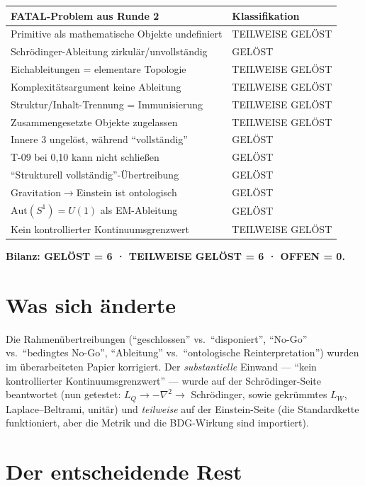 \documentclass[10pt,twoside,openany]{book}
\begin{document}
\begin{center}
\begin{tabular}{p{6.5cm}l}
\toprule
FATAL-Problem aus Runde 2 & Klassifikation \\
\midrule
Primitive als mathematische Objekte undefiniert & TEILWEISE GELÖST \\
Schr\"odinger-Ableitung zirkulär/unvollständig & GELÖST \\
Eichableitungen = elementare Topologie & TEILWEISE GELÖST \\
Komplexitätsargument keine Ableitung & TEILWEISE GELÖST \\
Struktur/Inhalt-Trennung = Immunisierung & TEILWEISE GELÖST \\
Zusammengesetzte Objekte zugelassen & TEILWEISE GELÖST \\
Innere 3 ungelöst, während ``vollständig'' & GELÖST \\
T-09 bei 0,10 kann nicht schließen & GELÖST \\
``Strukturell vollständig''-Übertreibung & GELÖST \\
Gravitation$\to$Einstein ist ontologisch & GELÖST \\
$\mathrm{Aut}(S^1)=U(1)$ als EM-Ableitung & GELÖST \\
Kein kontrollierter Kontinuumsgrenzwert & TEILWEISE GELÖST \\
\bottomrule
\end{tabular}
\end{center}

\textbf{Bilanz: GELÖST = 6 · TEILWEISE GELÖST = 6 · OFFEN = 0.}

\section{Was sich änderte}

Die Rahmenübertreibungen (``geschlossen'' vs.\ ``disponiert'', ``No-Go'' vs.\
``bedingtes No-Go'', ``Ableitung'' vs.\ ``ontologische Reinterpretation'') wurden im
überarbeiteten Papier korrigiert. Der \emph{substantielle} Einwand — ``kein kontrollierter
Kontinuumsgrenzwert'' — wurde auf der Schr\"odinger-Seite beantwortet (nun getestet:
$L_Q\to-\nabla^2\to$ Schr\"odinger, sowie gekrümmtes $L_W$, Laplace--Beltrami, unitär)
und \emph{teilweise} auf der Einstein-Seite (die Standardkette funktioniert, aber die
Metrik und die BDG-Wirkung sind importiert).

\section{Der entscheidende Rest}
\end{document}
